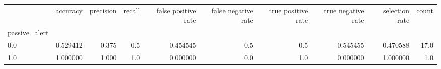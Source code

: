 \begin{tabular}{lrrrrrrrrr}
\toprule
{} &  accuracy &  precision &  recall &  false positive rate &  false negative rate &  true positive rate &  true negative rate &  selection rate &  count \\
passive\_alert &           &            &         &                      &                      &                     &                     &                 &        \\
\midrule
0.0           &  0.529412 &      0.375 &     0.5 &             0.454545 &                  0.5 &                 0.5 &            0.545455 &        0.470588 &   17.0 \\
1.0           &  1.000000 &      1.000 &     1.0 &             0.000000 &                  0.0 &                 1.0 &            0.000000 &        1.000000 &    1.0 \\
\bottomrule
\end{tabular}
